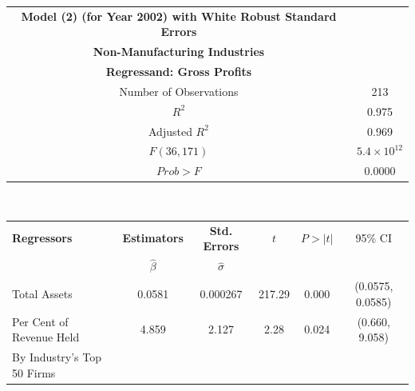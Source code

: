 \newpage
\begin{table}[h]
\begin{tabular}{ c | c }
	\hline
	\textbf{Model (2) (for Year 2002) with White Robust Standard Errors} \\
    \textbf{Non-Manufacturing Industries} \\
    \textbf{Regressand: Gross Profits} \\
    \hline \hline
    Number of Observations & 213 \\
	\hline
    $R^{2}$ & 0.975 \\
    Adjusted $R^{2}$ & 0.969 \\
    \hline
    $F(36, 171)$ & $5.4 \times 10^{12}$ \\
    $Prob > F$ & 0.0000 \\
    \hline \hline
\end{tabular} \\

\begin{tabular}{ l | c | c | c | c | c }
	\hline
	\textbf{Regressors} & \textbf{Estimators} & \textbf{Std. Errors} & $t$ & $P > |t|$ & 95\% CI \\
    & $\hat{\beta}$ & $\hat{\sigma}$ & & & \\
    \hline \hline
	Total Assets & 0.0581 & 0.000267 & 217.29 & 0.000 & (0.0575, 0.0585) \\
	\hline
    Per Cent of Revenue Held & 4.859 & 2.127 & 2.28 & 0.024 & (0.660, 9.058) \\
    By Industry’s Top 50 Firms & & & & & \\
    \hline
    \hline \hline
\end{tabular}
\end{table}

